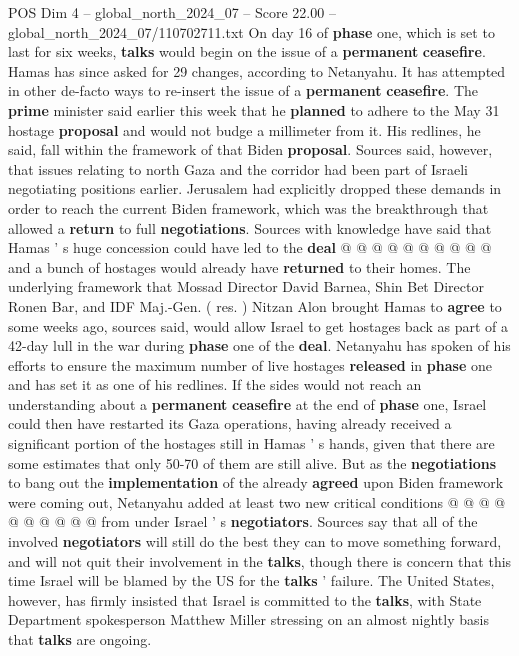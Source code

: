 \begin{textsample}{POS Dim 4 – global\_north\_2024\_07 – Score 22.00 – global\_north\_2024\_07/110702711.txt}
On day 16 of \textbf{phase} one, which is set to last for six weeks, \textbf{talks} would begin on the issue of a \textbf{permanent} \textbf{ceasefire}.
Hamas has since asked for 29 changes, according to Netanyahu.
It has attempted in other de-facto ways to re-insert the issue of a \textbf{permanent} \textbf{ceasefire}.
The \textbf{prime} minister said earlier this week that he \textbf{planned} to adhere to the May 31 hostage \textbf{proposal} and would not budge a millimeter from it.
His redlines, he said, fall within the framework of that Biden \textbf{proposal}.
Sources said, however, that issues relating to north Gaza and the corridor had been part of Israeli negotiating positions earlier.
Jerusalem had explicitly dropped these demands in order to reach the current Biden framework, which was the breakthrough that allowed a \textbf{return} to full \textbf{negotiations}.
Sources with knowledge have said that Hamas ' s huge concession could have led to the \textbf{deal} @ @ @ @ @ @ @ @ @ @ and a bunch of hostages would already have \textbf{returned} to their homes.
The underlying framework that Mossad Director David Barnea, Shin Bet Director Ronen Bar, and IDF Maj.-Gen. ( res. ) Nitzan Alon brought Hamas to \textbf{agree} to some weeks ago, sources said, would allow Israel to get hostages back as part of a 42-day lull in the war during \textbf{phase} one of the \textbf{deal}.
Netanyahu has spoken of his efforts to ensure the maximum number of live hostages \textbf{released} in \textbf{phase} one and has set it as one of his redlines.
If the sides would not reach an understanding about a \textbf{permanent} \textbf{ceasefire} at the end of \textbf{phase} one, Israel could then have restarted its Gaza operations, having already received a significant portion of the hostages still in Hamas ' s hands, given that there are some estimates that only 50-70 of them are still alive.
But as the \textbf{negotiations} to bang out the \textbf{implementation} of the already \textbf{agreed} upon Biden framework were coming out, Netanyahu added at least two new critical conditions @ @ @ @ @ @ @ @ @ @ from under Israel ' s \textbf{negotiators}.
Sources say that all of the involved \textbf{negotiators} will still do the best they can to move something forward, and will not quit their involvement in the \textbf{talks}, though there is concern that this time Israel will be blamed by the US for the \textbf{talks} ' failure.
The United States, however, has firmly insisted that Israel is committed to the \textbf{talks}, with State Department spokesperson Matthew Miller stressing on an almost nightly basis that \textbf{talks} are ongoing.

\end{textsample}
